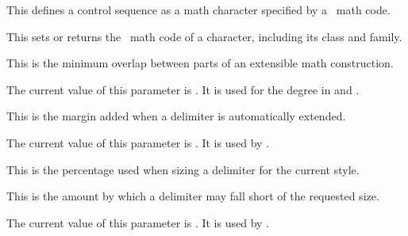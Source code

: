 \stopnewprimitive

\startnewprimitive[title={\prm {Umathchardef}}]

This defines a control sequence as a math character specified by a \UNICODE\ math
code.

\stopnewprimitive

\startnewprimitive[title={\prm {Umathcode}}]

This sets or returns the \UNICODE\ math code of a character, including its class
and family.

\stopnewprimitive

\startnewprimitive[title={\prm {Umathconnectoroverlapmin}}]

This is the minimum overlap between parts of an extensible math construction.

\stopnewprimitive

\startnewprimitive[title={\prm {Umathdegreevariant}}]

The current value of this parameter is \CurrentMathVariant \Umathdegreevariant.
It is used for the degree in  and .

\stopnewprimitive

\startnewprimitive[title={\prm {Umathdelimiterextendmargin}}]

This is the margin added when a delimiter is automatically extended.

\stopnewprimitive

\startnewprimitive[title={\prm {Umathdelimiterovervariant}}]

The current value of this parameter is \CurrentMathVariant
\Umathdelimiterovervariant. It is used by .

\stopnewprimitive

\startnewprimitive[title={\prm {Umathdelimiterpercent}}]

This is the percentage used when sizing a delimiter for the current style.

\stopnewprimitive

\startnewprimitive[title={\prm {Umathdelimitershortfall}}]

This is the amount by which a delimiter may fall short of the requested size.

\stopnewprimitive

\startnewprimitive[title={\prm {Umathdelimiterundervariant}}]

The current value of this parameter is \CurrentMathVariant
\Umathdelimiterundervariant. It is used by .

